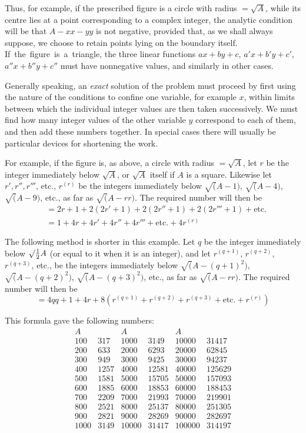 Thus, for example, if the prescribed figure is a circle with radius $=\surd A$, while its centre lies at a point corresponding to a complex integer, the analytic condition will be that $A-xx-yy$ is not negative, provided that, as we shall always suppose, we choose to retain points lying on the boundary itself. \mbox{If the figure is a triangle}, the three linear functions $ax+by+c$, $a'x+b'y+c'$, $a''x+b''y+c''$ must have nonnegative values, and similarly in other cases.

Generally speaking, an \emph{exact} solution of the problem must proceed by first using the nature of the conditions to confine one variable, for example $x$, within limits between which the individual integer values are then taken successively. We must find how many integer values of the other variable $y$ correspond to each of them, and then add these numbers together. In special cases there will usually be particular devices for shortening the work.

For example, if the figure is, as above, a circle with radius $=\surd A$, let $r$ be the integer immediately below $\surd A$, or $\surd A$ itself if $A$ is a square. Likewise let $r',r'',r'''$, etc., $r^{(r)}$ be the integers immediately below $\surd(A-1)$, $\surd(A-4)$, $\surd(A-9)$, etc., as far as $\surd(A-rr)$. The required number will then be
\[
\begin{aligned}
&=2r+1+2(2r'+1)+2(2r''+1)+2(2r'''+1)+\text{etc.}\\
&=1+4r+4r'+4r''+4r'''+\text{etc.}+4r^{(r)}
\end{aligned}
\]

The following method is shorter in this example. Let $q$ be the integer immediately below $\surd\tfrac12 A$ (or equal to it when it is an integer), and let $r^{(q+1)}$, $r^{(q+2)}$, $r^{(q+3)}$, etc., be the integers immediately below $\surd(A-(q+1)^2)$, $\surd(A-(q+2)^2)$, $\surd(A-(q+3)^2)$, etc., as far as $\surd(A-rr)$. The required number will then be
\[
=4qq+1+4r+8(r^{(q+1)}+r^{(q+2)}+r^{(q+3)}+\text{etc.}+r^{(r)})
\]

This formula gave the following numbers:
\[
\begin{array}{r|r||r|r||r|r}
A&&A&&A&\\\hline
100&317&1000&3149&10000&31417\\
200&633&2000&6293&20000&62845\\
300&949&3000&9425&30000&94237\\
400&1257&4000&12581&40000&125629\\
500&1581&5000&15705&50000&157093\\
600&1885&6000&18853&60000&188453\\
700&2209&7000&21993&70000&219901\\
800&2521&8000&25137&80000&251305\\
900&2821&9000&28269&90000&282697\\
1000&3149&10000&31417&100000&314197
\end{array}
\]

